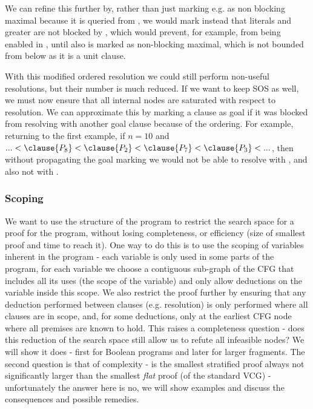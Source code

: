 We can refine this further by, rather than just marking e.g.  as non blocking maximal because it is queried from , we would mark instead that literals  and greater are not blocked by , which would prevent, for example,  from being enabled in , until also  is marked as non-blocking maximal, which is not bounded from below as it is a unit clause.

With this modified ordered resolution we could still perform non-useful resolutions, but their number is much reduced.
If we want to keep SOS as well, we must now ensure that all internal nodes are saturated with respect to resolution. 
We can approximate this by marking a clause as goal if it was blocked from resolving with another goal clause because of the ordering.
For example, returning to the first example, if $n=10$ and $...<\clause{P_8}<\clause{P_2}<\clause{P_7}<\clause{P_3}<...$, 
then without propagating the goal marking we would not be able to resolve 
 with , and also not 
 with .



\subsubsection{Scoping}
We want to use the structure of the program to restrict the search space for a proof for the program, without losing completeness, or efficiency (size of smallest proof and time to reach it).
One way to do this is to use the scoping of variables inherent in the program - each variable is only used in some parts of the program, for each variable we choose a contiguous sub-graph of the CFG that includes all its uses (the scope of the variable) and only allow deductions on the variable inside this scope.
We also restrict the proof further by ensuring that any deduction performed between clauses (e.g. resolution) is only performed where all clauses are in scope, and, for some deductions, only at the earliest CFG node where all premises are known to hold.
This raises a completeness question - does this reduction of the search space still allow us to refute all infeasible nodes? We will show it does - first for Boolean programs and later for larger fragments.
The second question is that of complexity - is the smallest stratified proof always not significantly larger than the smallest \emph{flat} proof (of the standard VCG) - unfortunately the answer here is no, we will show examples and discuss the consequences and possible remedies.

